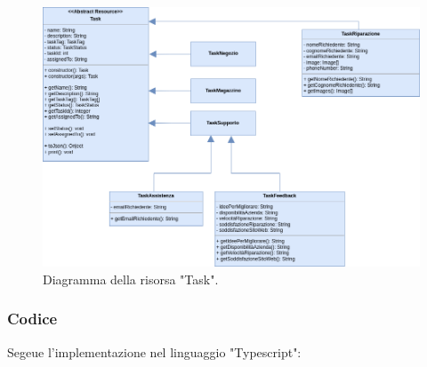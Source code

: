 \documentclass{report}
\begin{document}
\begin{figure}[H]
	\centering\includegraphics[width=1\textwidth]{images/resource_task.png}
	Diagramma della risorsa "Task".
\end{figure}

\subsubsection*{Codice}

Segeue l'implementazione nel linguaggio "Typescript":
\end{document}
